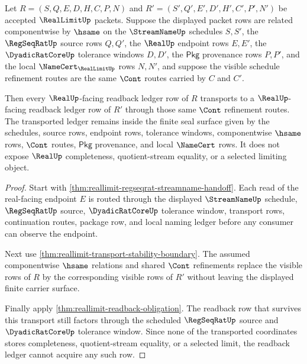 \begin{theorem}
\label{thm:reallimit-transported-readback-ledger-stability}
Let $R=(S,Q,E,D,H,C,P,N)$ and
$R'=(S',Q',E',D',H',C',P',N')$ be accepted $\RealLimitUp$ packets. Suppose the
displayed packet rows are related componentwise by $\hsame$ on the
$\StreamNameUp$ schedules $S,S'$, the $\RegSeqRatUp$ source rows $Q,Q'$, the
$\RealUp$ endpoint rows $E,E'$, the $\DyadicRatCoreUp$ tolerance windows
$D,D'$, the $\mathsf{Pkg}$ provenance rows $P,P'$, and the local
$\NameCert_{\RealLimitUp}$ rows $N,N'$, and suppose the visible schedule
refinement routes are the same $\Cont$ routes carried by $C$ and $C'$.

Then every $\RealUp$-facing readback ledger row of $R$ transports to a
$\RealUp$-facing readback ledger row of $R'$ through those same $\Cont$
refinement routes. The transported ledger remains inside the finite seal
surface given by the schedules, source rows, endpoint rows, tolerance windows,
componentwise $\hsame$ rows, $\Cont$ routes, $\mathsf{Pkg}$ provenance, and
local $\NameCert$ rows. It does not expose $\RealUp$ completeness,
quotient-stream equality, or a selected limiting object.
\end{theorem}
\begin{proof}
Start with \autoref{thm:reallimit-regseqrat-streamname-handoff}. Each read of
the real-facing endpoint $E$ is routed through the displayed
$\StreamNameUp$ schedule, $\RegSeqRatUp$ source, $\DyadicRatCoreUp$ tolerance
window, transport rows, continuation routes, package row, and local naming
ledger before any consumer can observe the endpoint.

Next use \autoref{thm:reallimit-transport-stability-boundary}. The assumed
componentwise $\hsame$ relations and shared $\Cont$ refinements replace the
visible rows of $R$ by the corresponding visible rows of $R'$ without leaving
the displayed finite carrier surface.

Finally apply \autoref{thm:reallimit-readback-obligation}. The readback row
that survives this transport still factors through the scheduled
$\RegSeqRatUp$ source and $\DyadicRatCoreUp$ tolerance window. Since none of
the transported coordinates stores completeness, quotient-stream equality, or
a selected limit, the readback ledger cannot acquire any such row.
\end{proof}

